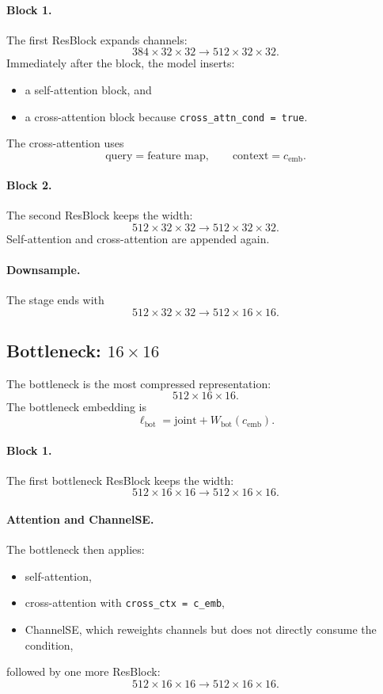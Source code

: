\documentclass[11pt]{article}
\begin{document}
\paragraph{Block 1.}
The first ResBlock expands channels:
\[
384 \times 32 \times 32 \to 512 \times 32 \times 32.
\]
Immediately after the block, the model inserts:
\begin{itemize}
  \item a self-attention block, and
  \item a cross-attention block because \texttt{cross\_attn\_cond = true}.
\end{itemize}
The cross-attention uses
\[
\text{query} = \text{feature map}, \qquad \text{context} = c_{\mathrm{emb}}.
\]
\paragraph{Block 2.}
The second ResBlock keeps the width:
\[
512 \times 32 \times 32 \to 512 \times 32 \times 32.
\]
Self-attention and cross-attention are appended again.
\paragraph{Downsample.}
The stage ends with
\[
512 \times 32 \times 32 \to 512 \times 16 \times 16.
\]

\subsection{Bottleneck: $16 \times 16$}
The bottleneck is the most compressed representation:
\[
512 \times 16 \times 16.
\]
The bottleneck embedding is
\[
\ell_{\mathrm{bot}} = \mathrm{joint} + W_{\mathrm{bot}}(c_{\mathrm{emb}}).
\]
\paragraph{Block 1.}
The first bottleneck ResBlock keeps the width:
\[
512 \times 16 \times 16 \to 512 \times 16 \times 16.
\]
\paragraph{Attention and ChannelSE.}
The bottleneck then applies:
\begin{itemize}
  \item self-attention,
  \item cross-attention with \texttt{cross\_ctx = c\_emb},
  \item ChannelSE, which reweights channels but does not directly consume the condition,
\end{itemize}
followed by one more ResBlock:
\[
512 \times 16 \times 16 \to 512 \times 16 \times 16.
\]
\end{document}
